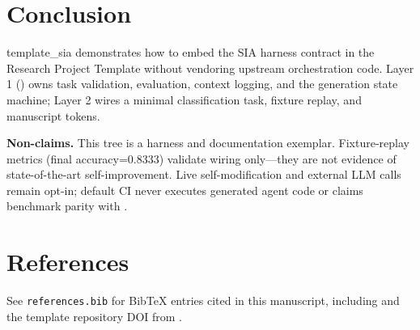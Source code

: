 \documentclass[
]{article}
\begin{document}
\section{Conclusion}\label{sec:conclusion}

template\_sia demonstrates how to embed the SIA harness contract in the
Research Project Template without vendoring upstream orchestration code.
Layer 1 () owns task validation, evaluation,
context logging, and the generation state machine; Layer 2 wires a
minimal classification task, fixture replay, and manuscript tokens.

\textbf{Non-claims.} This tree is a harness and documentation exemplar.
Fixture-replay metrics (final accuracy=0.8333) validate wiring
only---they are not evidence of state-of-the-art self-improvement. Live
self-modification and external LLM calls remain opt-in; default CI never
executes generated agent code or claims benchmark parity with
\citep{sia2026}.

\newpage

\section{References}\label{sec:references}

See \texttt{references.bib} for BibTeX entries cited in this manuscript,
including \citep{sia2026} and the template repository DOI from
.



\clearpage


\end{document}
